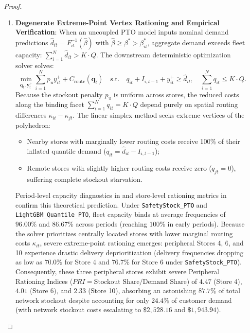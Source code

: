 \documentclass[11pt,a4paper]{article}
\theoremstyle{definition}
\theoremstyle{remark}
\begin{document}
\begin{itemize}[leftmargin=*]
\begin{proof}
\begin{enumerate}[label=\textbf{Part \arabic*.},wide=0pt]
        \item \textbf{Degenerate Extreme-Point Vertex Rationing and Empirical Verification}:
        When an uncoupled PTO model inputs nominal demand predictions $\hat{d}_{it} = F_{it}^{-1}(\hat{\beta})$ with $\hat{\beta} \ge \beta^* > \beta_{it}^*$, aggregate demand exceeds fleet capacity: $\sum_{i=1}^N \hat{d}_{it} > K \cdot Q$. The downstream deterministic optimization solver solves:
        \begin{equation*}
            \min_{\mathbf{q}_t, \mathbf{y}_t^+} \sum_{i=1}^N p_u y_{it}^+ + C_{\text{route}}(\mathbf{q}_t) \quad \text{s.t.} \quad q_{it} + I_{i,t-1} + y_{it}^+ \ge \hat{d}_{it}, \quad \sum_{i=1}^N q_{it} \le K \cdot Q.
        \end{equation*}
        Because the stockout penalty $p_u$ is uniform across stores, the reduced costs along the binding facet $\sum_{i=1}^N q_{it} = K \cdot Q$ depend purely on spatial routing differences $\kappa_{it} - \kappa_{jt}$. The linear simplex method seeks extreme vertices of the polyhedron:
        \begin{itemize}
            \item Nearby stores with marginally lower routing costs receive 100\% of their inflated quantile demand ($q_{it} = \hat{d}_{it} - I_{i,t-1}$);
            \item Remote stores with slightly higher routing costs receive zero ($q_{jt} = 0$), suffering complete stockout starvation.
        \end{itemize}
        Period-level capacity diagnostics in  and store-level rationing metrics in  confirm this theoretical prediction. Under \texttt{SafetyStock\_PTO} and \texttt{LightGBM\_Quantile\_PTO}, fleet capacity binds at average frequencies of $96.00\%$ and $86.67\%$ across periods (reaching $100\%$ in early periods). Because the solver prioritizes centrally located stores with lower marginal routing costs $\kappa_{it}$, severe extreme-point rationing emerges: peripheral Stores 4, 6, and 10 experience drastic delivery deprioritization (delivery frequencies dropping as low as $70.0\%$ for Store 4 and $76.7\%$ for Store 6 under \texttt{SafetyStock\_PTO}). Consequently, these three peripheral stores exhibit severe Peripheral Rationing Indices ($PRI = \text{Stockout Share} / \text{Demand Share}$) of $4.47$ (Store 4), $4.01$ (Store 6), and $2.33$ (Store 10), absorbing an astonishing $87.7\%$ of total network stockout despite accounting for only $24.4\%$ of customer demand (with network stockout costs escalating to $\$2,528.16$ and $\$1,943.94$).


\end{enumerate}
\end{proof}
\end{itemize}
\end{document}
